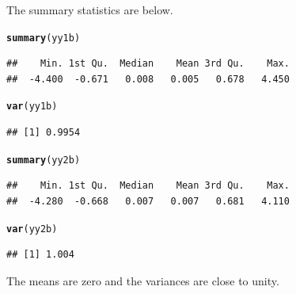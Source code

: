 \documentclass[12pt, a4paper, oneside]{article}\usepackage{graphicx, color}
\makeatletter
\newcommand{\hlfunctioncall}[1]{\textcolor[rgb]{0.501960784313725,0,0.329411764705882}{\textbf{#1}}}%
\newenvironment{kframe}{%
 \def\at@end@of@kframe{}%
 \ifinner\ifhmode%
  \def\at@end@of@kframe{\end{minipage}}%
  \begin{minipage}{\columnwidth}%
 \fi\fi%
 \def\FrameCommand##1{\hskip\@totalleftmargin \hskip-\fboxsep
 \colorbox{shadecolor}{##1}\hskip-\fboxsep
     \hskip-\linewidth \hskip-\@totalleftmargin \hskip\columnwidth}%
 \MakeFramed {\advance\hsize-\width
   \@totalleftmargin\z@ \linewidth\hsize
   \@setminipage}}%
 {\par\unskip\endMakeFramed%
 \at@end@of@kframe}
\newenvironment{knitrout}{}{} %
\makeatother
\begin{document}
The summary statistics are below. 
\begin{knitrout}
\color{fgcolor}\begin{kframe}
\begin{alltt}
\hlfunctioncall{summary}(yy1b)
\end{alltt}
\begin{verbatim}
##    Min. 1st Qu.  Median    Mean 3rd Qu.    Max. 
##  -4.400  -0.671   0.008   0.005   0.678   4.450
\end{verbatim}
\begin{alltt}
\hlfunctioncall{var}(yy1b)
\end{alltt}
\begin{verbatim}
## [1] 0.9954
\end{verbatim}
\begin{alltt}
\hlfunctioncall{summary}(yy2b)
\end{alltt}
\begin{verbatim}
##    Min. 1st Qu.  Median    Mean 3rd Qu.    Max. 
##  -4.280  -0.668   0.007   0.007   0.681   4.110
\end{verbatim}
\begin{alltt}
\hlfunctioncall{var}(yy2b)
\end{alltt}
\begin{verbatim}
## [1] 1.004
\end{verbatim}
\end{kframe}
\end{knitrout}

The means are zero and the variances are close  to unity. 
\end{document}
